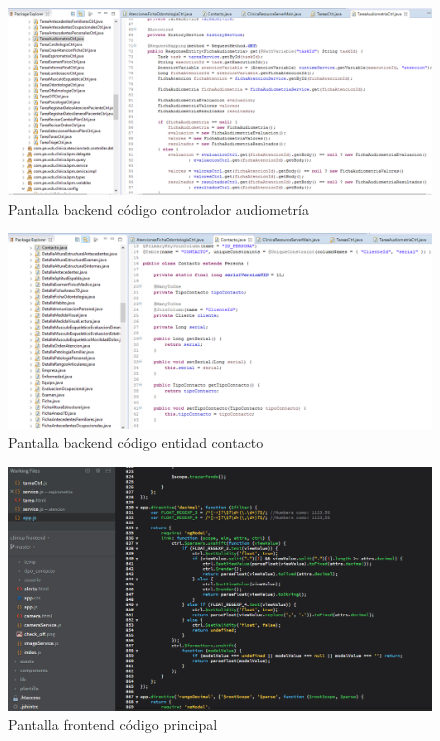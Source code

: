 			\begin{figure}[H]
			    \centering
				\includegraphics[width=18cm]{../imgs/codigo/back-ctrl.png}
				\caption{Pantalla backend código controlador audiometría}
				\label{figure:back-ctrl}
			\end{figure}
			
			
			\begin{figure}[H]
			    \centering
				\includegraphics[width=18cm]{../imgs/codigo/back-entity.png}
				\caption{Pantalla backend código entidad contacto}
				\label{figure:back-entity}
			\end{figure}
			
			\begin{figure}[H]
			    \centering
				\includegraphics[width=18cm]{../imgs/codigo/front-main.png}
				\caption{Pantalla frontend código principal}
				\label{figure:front-main}
			\end{figure}
			
